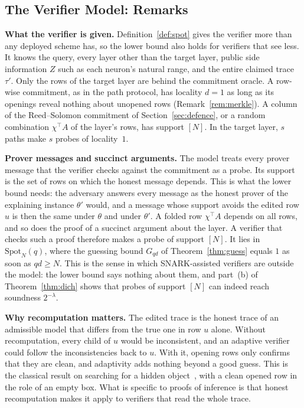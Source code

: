 \providecommand{\para}[1]{\par\noindent\textbf{#1}\quad}
\providecommand{\todo}[1]{\textbf{[TODO: #1]}}

\subsection{The Verifier Model: Remarks}
\label{ext:attack-model}

\para{What the verifier is given.} Definition~\ref{def:spot} gives the verifier more than any
deployed scheme has, so the lower bound also holds for verifiers that see less. It knows the query, every layer other than the target layer, public side
information $Z$ such as each neuron's natural range, and the entire claimed trace $\tau'$. Only the
rows of the target layer are behind the commitment oracle. A row-wise commitment, as in the path
protocol, has locality $d=1$ as long as its openings reveal nothing about unopened rows
(Remark~\ref{rem:merkle}). A column of the Reed--Solomon commitment of Section~\ref{sec:defence},
or a random combination $\chi^{\top}\!A$ of the layer's rows, has support $[N]$. In the target
layer, $s$ paths make $s$ probes of locality~$1$.

\para{Prover messages and succinct arguments.} The model treats every prover message that the
verifier checks against the commitment as a probe. Its support is the set of rows on which
the honest message depends. This is what the lower bound needs: the adversary answers every
message as the honest prover of the explaining instance $\theta'$ would, and a message whose
support avoids the edited row $u$ is then the same under $\theta$ and under $\theta'$. A folded row
$\chi^{\top}\!A$ depends on all rows, and so does the proof of a succinct argument about the layer.
A verifier that checks such a proof therefore makes a probe of support $[N]$. It lies in
$\mathrm{Spot}_N(q)$, where the guessing bound $G_{qd}$ of Theorem~\ref{thm:guess} equals $1$ as
soon as $qd\ge N$. This is the sense in which SNARK-assisted verifiers are outside the model: the lower bound says nothing
about them, and part~(b) of Theorem~\ref{thm:dich} shows that probes of support $[N]$ can indeed
reach soundness $2^{-\lambda}$.

\para{Why recomputation matters.} The edited trace is the honest trace of an admissible model that
differs from the true one in row $u$ alone. Without recomputation, every child of $u$ would be
inconsistent, and an adaptive verifier could follow the inconsistencies back to $u$. With it,
opening rows only confirms that they are clean, and adaptivity adds nothing beyond a good guess.
This is the classical result on searching for a hidden object~\cite{chew1967,kadane1971}, with a
clean opened row in the role of an empty box. What is specific to proofs of inference is that
honest recomputation makes it apply to verifiers that read the whole trace.

